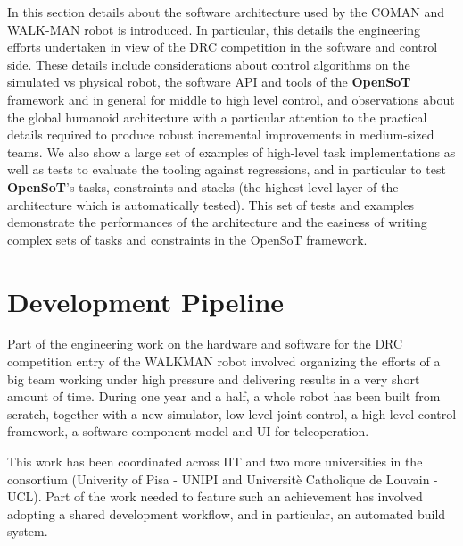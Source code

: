 

In this section details about the software architecture used by the COMAN and WALK-MAN robot is introduced. In particular, this details the engineering efforts undertaken in view of the DRC competition in the software and control side. 
These details include considerations about control algorithms on the simulated vs physical robot, the software API and tools of the \textbf{OpenSoT} framework and in general for middle to high level control, and observations about the global humanoid architecture with a particular attention to the practical details required to produce robust incremental improvements in medium-sized teams. We also show a large set of examples of high-level task implementations as well as tests to evaluate the tooling against regressions, and in particular to test \textbf{OpenSoT}'s tasks, constraints and stacks (the highest level layer of the architecture which is automatically tested).
This set of tests and examples demonstrate the performances of the architecture and the easiness of writing complex sets of tasks and constraints in the OpenSoT framework.

\section{Development Pipeline}
Part of the engineering work on the hardware and software for the DRC competition entry of the WALKMAN robot involved organizing the efforts of a big team working under high pressure and delivering results in a very short amount of time.
During one year and a half, a whole robot has been built from scratch, together with a new simulator, low level joint control, a high level control framework, a software component model and UI for teleoperation.

This work has been coordinated across IIT and two more universities in the consortium (Univerity of Pisa - UNIPI and Universit\`e Catholique de Louvain - UCL). Part of the work needed to feature such an achievement has involved adopting a shared development workflow, and in particular, an automated build system.

